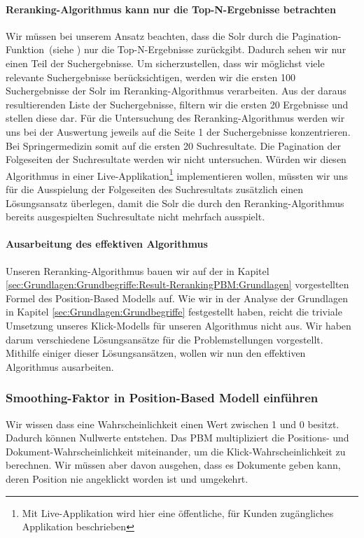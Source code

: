 \paragraph{Reranking-Algorithmus kann nur die Top-N-Ergebnisse betrachten}
Wir müssen bei unserem Ansatz beachten, dass die Solr durch die Pagination-Funktion~(siehe \cite{Pagination}) nur die Top-N-Ergebnisse zurückgibt. Dadurch sehen wir nur einen Teil der Suchergebnisse. Um sicherzustellen, dass wir möglichst viele relevante Suchergebnisse berücksichtigen, werden wir die ersten 100 Suchergebnisse der Solr im Reranking-Algorithmus verarbeiten. Aus der daraus resultierenden Liste der Suchergebnisse, filtern wir die ersten 20 Ergebnisse und stellen diese dar. Für die Untersuchung des Reranking-Algorithmus werden wir uns bei der Auswertung jeweils auf die Seite 1 der Suchergebnisse konzentrieren. Bei Springermedizin somit auf die ersten 20 Suchresultate. Die Pagination der Folgeseiten der Suchresultate werden wir nicht untersuchen. Würden wir diesen Algorithmus in einer Live-Applikation\footnote{Mit Live-Applikation wird hier eine öffentliche, für Kunden zugängliches Applikation beschrieben} implementieren wollen, müssten wir uns für die Ausspielung der Folgeseiten des Suchresultats zusätzlich einen Lösungsansatz überlegen, damit die Solr die durch den Reranking-Algorithmus bereits ausgespielten Suchresultate nicht mehrfach ausspielt.

\paragraph{Ausarbeitung des effektiven Algorithmus}
Unseren Reranking-Algorithmus bauen wir auf der in Kapitel \ref{sec:Grundlagen:Grundbegriffe:Result-RerankingPBM:Grundlagen} vorgestellten Formel des Position-Based Modells auf. Wie wir in der Analyse der Grundlagen in Kapitel \ref{sec:Grundlagen:Grundbegriffe} festgestellt haben, reicht die triviale Umsetzung unseres Klick-Modells für unseren Algorithmus nicht aus. Wir haben darum verschiedene Lösungsansätze für die Problemstellungen vorgestellt. Mithilfe einiger dieser Lösungsansätzen, wollen wir nun den effektiven Algorithmus ausarbeiten.

\subsubsection{Smoothing-Faktor in Position-Based Modell einführen}
\label{sec:Reranking:Methodik:Result-RerankingPBM:SmoothingPBM}

Wir wissen dass eine Wahrscheinlichkeit einen Wert zwischen 1 und 0 besitzt. Dadurch können Nullwerte entstehen. Das PBM multipliziert die Positions- und Dokument-Wahrscheinlichkeit miteinander, um die Klick-Wahrscheinlichkeit zu berechnen. Wir müssen aber davon ausgehen, dass es Dokumente geben kann, deren Position nie angeklickt worden ist und umgekehrt. 

